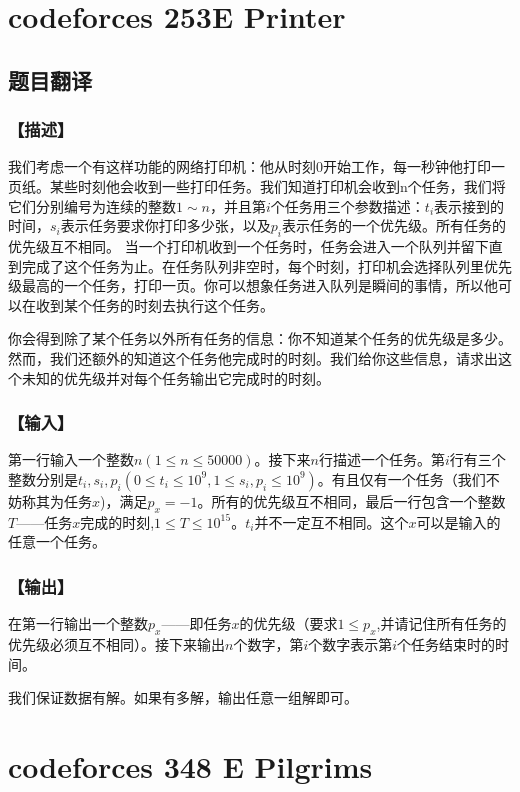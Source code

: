 \documentclass{ctexart}
\begin{document}
	\section{codeforces 253E Printer}
		\subsection{题目翻译}
			\subsubsection{【描述】}
				我们考虑一个有这样功能的网络打印机：他从时刻0开始工作，每一秒钟他打印一页纸。某些时刻他会收到一些打印任务。我们知道打印机会收到n个任务，我们将它们分别编号为连续的整数$1\sim n$，并且第$i$个任务用三个参数描述：$t_i$表示接到的时间，$s_i$表示任务要求你打印多少张，以及$p_i$表示任务的一个优先级。所有任务的优先级互不相同。
				当一个打印机收到一个任务时，任务会进入一个队列并留下直到完成了这个任务为止。在任务队列非空时，每个时刻，打印机会选择队列里优先级最高的一个任务，打印一页。你可以想象任务进入队列是瞬间的事情，所以他可以在收到某个任务的时刻去执行这个任务。

				你会得到除了某个任务以外所有任务的信息：你不知道某个任务的优先级是多少。然而，我们还额外的知道这个任务他完成时的时刻。我们给你这些信息，请求出这个未知的优先级并对每个任务输出它完成时的时刻。
			\subsubsection{【输入】}
				第一行输入一个整数$n(1 \le n \le 50000)$。接下来$n$行描述一个任务。第$i$行有三个整数分别是$t_i,s_i,p_i(0\le t_i \le 10^9,1 \le s_i,p_i \le 10^9)$。有且仅有一个任务（我们不妨称其为任务$x$)，满足$p_x=-1$。所有的优先级互不相同，最后一行包含一个整数$T$——任务$x$完成的时刻,$1 \le T \le 10^{15}$。$t_i$并不一定互不相同。这个$x$可以是输入的任意一个任务。

			\subsubsection{【输出】}
				在第一行输出一个整数$p_x$——即任务$x$的优先级（要求$1 \le p_x$,并请记住所有任务的优先级必须互不相同）。接下来输出$n$个数字，第$i$个数字表示第$i$个任务结束时的时间。

				我们保证数据有解。如果有多解，输出任意一组解即可。
	\newpage
	\section{codeforces 348 E Pilgrims}
\end{document}
